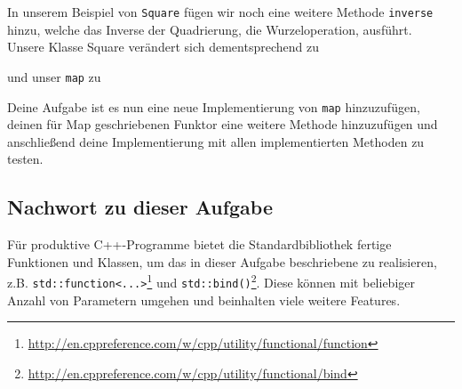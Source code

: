 In unserem Beispiel von \lstinline{Square} fügen wir noch eine weitere Methode \lstinline{inverse} hinzu, welche das Inverse der Quadrierung, die Wurzeloperation, ausführt. \\

Unsere Klasse Square verändert sich dementsprechend zu



und unser \lstinline{map} zu 



Deine Aufgabe ist es nun eine neue Implementierung von \lstinline{map} hinzuzufügen, deinen für Map geschriebenen Funktor eine weitere Methode hinzuzufügen und anschließend deine Implementierung mit allen implementierten Methoden zu testen.

\subsection*{Nachwort zu dieser Aufgabe}
Für produktive C++-Programme bietet die Standardbibliothek fertige Funktionen und Klassen, um das in dieser Aufgabe beschriebene zu realisieren, z.B. \lstinline{std::function<...>}\footnote{\url{http://en.cppreference.com/w/cpp/utility/functional/function}} und \lstinline{std::bind()}\footnote{\url{http://en.cppreference.com/w/cpp/utility/functional/bind}}.
Diese können mit beliebiger Anzahl von Parametern umgehen und beinhalten viele weitere Features.
